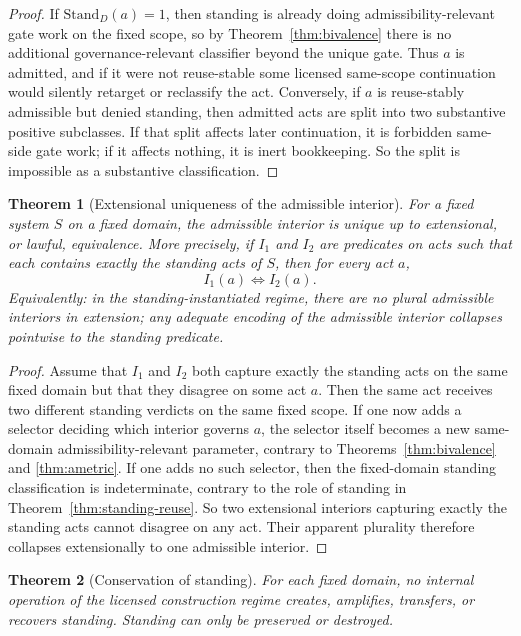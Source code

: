 \documentclass[11pt]{article}
\newtheorem{theorem}{Theorem}[section]
\theoremstyle{definition}
\theoremstyle{remark}
\begin{document}
\begin{proof}
If $\mathrm{Stand}_D(a)=1$, then standing is already doing admissibility-relevant gate work on the fixed scope, so by Theorem~\ref{thm:bivalence} there is no additional governance-relevant classifier beyond the unique gate. Thus $a$ is admitted, and if it were not reuse-stable some licensed same-scope continuation would silently retarget or reclassify the act. Conversely, if $a$ is reuse-stably admissible but denied standing, then admitted acts are split into two substantive positive subclasses. If that split affects later continuation, it is forbidden same-side gate work; if it affects nothing, it is inert bookkeeping. So the split is impossible as a substantive classification.
\end{proof}

\begin{theorem}[Extensional uniqueness of the admissible interior]\label{thm:unique-interior}
For a fixed system $S$ on a fixed domain, the admissible interior is unique up to extensional, or lawful, equivalence. More precisely, if $I_1$ and $I_2$ are predicates on acts such that each contains exactly the standing acts of $S$, then for every act $a$,
\[
I_1(a) \iff I_2(a).
\]
Equivalently: in the standing-instantiated regime, there are no plural admissible interiors in extension; any adequate encoding of the admissible interior collapses pointwise to the standing predicate.
\end{theorem}

\begin{proof}
Assume that $I_1$ and $I_2$ both capture exactly the standing acts on the same fixed domain but that they disagree on some act $a$. Then the same act receives two different standing verdicts on the same fixed scope. If one now adds a selector deciding which interior governs $a$, the selector itself becomes a new same-domain admissibility-relevant parameter, contrary to Theorems~\ref{thm:bivalence} and \ref{thm:ametric}. If one adds no such selector, then the fixed-domain standing classification is indeterminate, contrary to the role of standing in Theorem~\ref{thm:standing-reuse}. So two extensional interiors capturing exactly the standing acts cannot disagree on any act. Their apparent plurality therefore collapses extensionally to one admissible interior.
\end{proof}

\begin{theorem}[Conservation of standing]\label{thm:conservation}
For each fixed domain, no internal operation of the licensed construction regime creates, amplifies, transfers, or recovers standing. Standing can only be preserved or destroyed.
\end{theorem}
\end{document}
